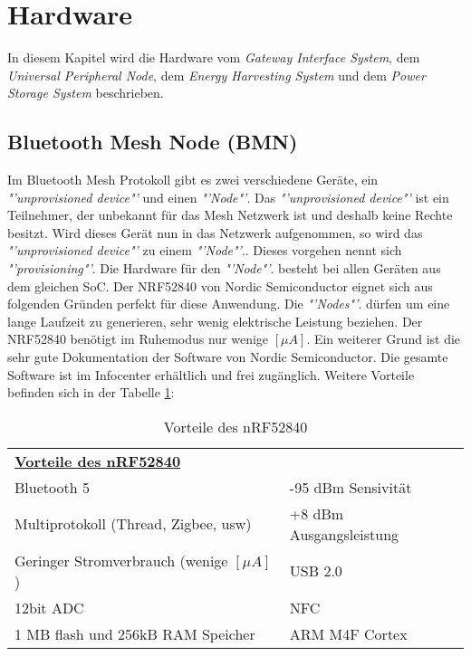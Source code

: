 \clearpage
\section{Hardware}\label{sec:Hardware}
In diesem Kapitel wird die Hardware vom \textit{Gateway Interface System}, dem \textit{Universal Peripheral Node}, dem \textit{Energy Harvesting System} und dem \textit{Power Storage System} beschrieben. 


\subsection{Bluetooth Mesh Node (BMN)}\label{subsec:BMN}
Im Bluetooth Mesh Protokoll gibt es zwei verschiedene  Geräte, ein \textit{"'unprovisioned device"'} und einen \textit{"'Node"'}. Das \textit{"'unprovisioned device"'}  ist ein Teilnehmer, der unbekannt für das Mesh Netzwerk ist und deshalb keine Rechte besitzt. Wird dieses Gerät nun in das Netzwerk aufgenommen, so wird das \textit{"'unprovisioned device"'}  zu einem \textit{"'Node"'}.. Dieses vorgehen nennt sich \textit{"'provisioning"'}. Die Hardware für den \textit{"'Node"'}. besteht bei allen Geräten aus dem gleichen SoC. Der NRF52840 von Nordic Semiconductor eignet sich aus folgenden Gründen perfekt für diese Anwendung. Die \textit{"'Nodes"'}. dürfen um eine lange Laufzeit zu generieren, sehr wenig elektrische Leistung beziehen. Der NRF52840 benötigt im Ruhemodus nur wenige $[\mu A]$. Ein weiterer Grund ist die sehr gute Dokumentation der Software von Nordic Semiconductor. Die gesamte Software ist im Infocenter erhältlich und frei zugänglich. Weitere Vorteile befinden sich in der Tabelle \ref{tbl:Vorteilte_nRF52}:\\

\cite{jaeger_was_2018}

\begin{table}[h]
	\begin{tabular}{ll}
		\multicolumn{2}{l}{{\ul \textbf{Vorteile des nRF52840}}}       \\
		Bluetooth 5                          											   & -95 dBm Sensivität      \\
		Multiprotokoll (Thread, Zigbee, usw) 						   & +8 dBm Ausgangsleistung \\
		Geringer Stromverbrauch  (wenige $[\mu A]$)      	& USB 2.0                 \\
		12bit ADC                            												& NFC                     \\
		1 MB flash und 256kB RAM Speicher    						& ARM M4F Cortex         
	\end{tabular}
	\caption{Vorteile des nRF52840}
	\label{tbl:Vorteilte_nRF52}
\end{table}


